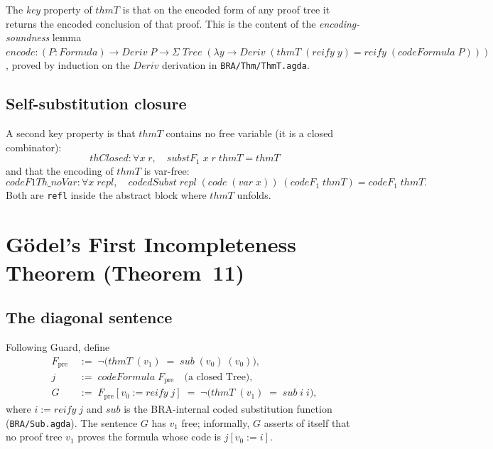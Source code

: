 \documentclass[11pt]{article}
\begin{document}
The \emph{key} property of $\mathit{thmT}$ is that on the encoded form of any proof tree it returns the
encoded conclusion of that proof.  This is the content of the \emph{encoding-soundness} lemma
$\mathit{encode} : (P : \mathit{Formula}) \to \mathit{Deriv}\;P \to \Sigma\;\mathit{Tree}\;(\lambda y \to \mathit{Deriv}\;(\mathit{thmT}\;(\mathit{reify}\;y) = \mathit{reify}\;(\mathit{codeFormula}\;P)))$,
proved by induction on the $\mathit{Deriv}$ derivation in
\verb|BRA/Thm/ThmT.agda|.

\subsection{Self-substitution closure}

A second key property is that $\mathit{thmT}$ contains no free variable (it is a closed combinator):
\[
  \mathit{thClosed} : \forall x\;r,\quad \mathit{substF}_1\;x\;r\;\mathit{thmT} = \mathit{thmT}
\]
and that the encoding of $\mathit{thmT}$ is var-free:
\[
  \mathit{codeF1Th\_noVar} : \forall x\;\mathit{repl},\quad \mathit{codedSubst}\;\mathit{repl}\;(\mathit{code}\;(\mathit{var}\;x))\;(\mathit{codeF}_1\;\mathit{thmT}) = \mathit{codeF}_1\;\mathit{thmT}.
\]
Both are \verb|refl| inside the abstract block where $\mathit{thmT}$ unfolds.

\section{G\"odel's First Incompleteness Theorem (Theorem~11)}

\subsection{The diagonal sentence}

Following Guard, define
\begin{align*}
  F_{\mathrm{pre}} \;&:=\; \neg \big(\mathit{thmT}\;(v_1) \;=\; \mathit{sub}\;(v_0)\;(v_0)\big),\\
  j \;&:=\; \mathit{codeFormula}\;F_{\mathrm{pre}} \quad \text{(a closed Tree)},\\
  G \;&:=\; F_{\mathrm{pre}}[v_0 := \mathit{reify}\;j] \;=\; \neg\big(\mathit{thmT}\;(v_1) \;=\; \mathit{sub}\;i\;i\big),
\end{align*}
where $i := \mathit{reify}\;j$ and $\mathit{sub}$ is the BRA-internal coded substitution function (\verb|BRA/Sub.agda|).
The sentence $G$ has $v_1$ free; informally, $G$ asserts of itself that no proof tree $v_1$ proves the formula whose code is $j[v_0 := i]$.
\end{document}
